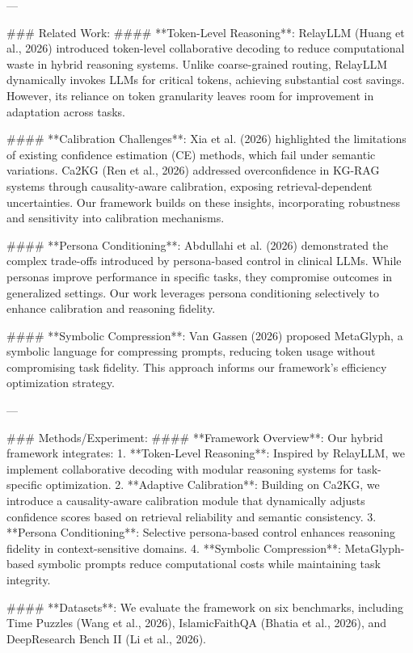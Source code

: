 ---

### Related Work:
#### **Token-Level Reasoning**:
RelayLLM (Huang et al., 2026) introduced token-level collaborative decoding to reduce computational waste in hybrid reasoning systems. Unlike coarse-grained routing, RelayLLM dynamically invokes LLMs for critical tokens, achieving substantial cost savings. However, its reliance on token granularity leaves room for improvement in adaptation across tasks.

#### **Calibration Challenges**:
Xia et al. (2026) highlighted the limitations of existing confidence estimation (CE) methods, which fail under semantic variations. Ca2KG (Ren et al., 2026) addressed overconfidence in KG-RAG systems through causality-aware calibration, exposing retrieval-dependent uncertainties. Our framework builds on these insights, incorporating robustness and sensitivity into calibration mechanisms.

#### **Persona Conditioning**:
Abdullahi et al. (2026) demonstrated the complex trade-offs introduced by persona-based control in clinical LLMs. While personas improve performance in specific tasks, they compromise outcomes in generalized settings. Our work leverages persona conditioning selectively to enhance calibration and reasoning fidelity.

#### **Symbolic Compression**:
Van Gassen (2026) proposed MetaGlyph, a symbolic language for compressing prompts, reducing token usage without compromising task fidelity. This approach informs our framework's efficiency optimization strategy.

---

### Methods/Experiment:
#### **Framework Overview**:
Our hybrid framework integrates:
1. **Token-Level Reasoning**: Inspired by RelayLLM, we implement collaborative decoding with modular reasoning systems for task-specific optimization.
2. **Adaptive Calibration**: Building on Ca2KG, we introduce a causality-aware calibration module that dynamically adjusts confidence scores based on retrieval reliability and semantic consistency.
3. **Persona Conditioning**: Selective persona-based control enhances reasoning fidelity in context-sensitive domains.
4. **Symbolic Compression**: MetaGlyph-based symbolic prompts reduce computational costs while maintaining task integrity.

#### **Datasets**:
We evaluate the framework on six benchmarks, including Time Puzzles (Wang et al., 2026), IslamicFaithQA (Bhatia et al., 2026), and DeepResearch Bench II (Li et al., 2026).

